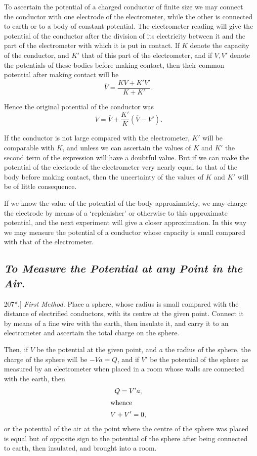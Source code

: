 \documentclass[12pt,oneside]{book}[2021/10/04]
\newcommand{\Heading}{\centering\normalfont}
\newcommand{\Subsection}[1]{\subsection*{\normalsize\Heading\itshape #1}}
\newcommand{\Runhead}[1]{\fancyhead[C]{\iffloatpage{}{\small#1}}}
\newcommand{\article}[1]{\phantomsection \label{art:#1}{#1.]}}
\newcommand{\¬}{\hphantom{0}}
\begin{document}
To ascertain the potential of a charged conductor of finite size
we may connect the conductor with one electrode of the electrometer,
while the other is connected to earth or to a body of
constant potential. The electrometer reading will give the potential
of the conductor after the division of its electricity between it
and the part of the electrometer with which it is put in contact.
If \(K\) denote the capacity of the conductor, and \(K'\) that of this part
of the electrometer, and if \(V, V'\) denote the potentials of these
bodies before making contact, then their common potential after
making contact will be
\[
  \overline{V} = \frac{KV + K'V'}{K + K'}\text{.}
\]

Hence the original potential of the conductor was
\[
  V = \overline{V} + \frac{K'}{K} (\overline{V} - V')\text{.}
\]

If the conductor is not large compared with the electrometer,
\(K'\) will be comparable with \(K\), and unless we can ascertain the
values of \(K\) and \(K'\) the second term of the expression will have
a doubtful value. But if we can make the potential of the electrode
of the electrometer very nearly equal to that of the body before
making contact, then the uncertainty of the values of \(K\) and \(K'\)
will be of little consequence.

If we know the value of the potential of the body approximately,
we may charge the electrode by means of a `replenisher' or otherwise
to this approximate potential, and the next experiment will
give a closer approximation. In this way we may measure the
potential of a conductor whose capacity is small compared with that
of the electrometer.

\Subsection{To Measure the Potential at any Point in the Air.}

\article{207*} \textit{First Method.} Place a sphere, whose radius is small compared
with the distance of electrified conductors, with its centre
at the given point. Connect it by means of a fine wire with the
earth, then insulate it, and carry it to an electrometer and ascertain
the total charge on the sphere.
\Runhead{POTENTIAL AT ANY POINT IN THE AIR.}

Then, if \(V\) be the potential at the given point, and \(a\) the
radius of the sphere, the charge of the sphere will be \(-Va = Q\),
and if \(V'\) be the potential of the sphere as measured by an
electrometer when placed in a room whose walls are connected
with the earth, then
\begin{gather*}
Q = V'a\text{,}\\
\shortintertext{whence}
V + V' = 0\text{,}
\end{gather*}
or the potential of the air at the point where the centre of the
sphere was placed is equal but of opposite sign to the potential of
the sphere after being connected to earth, then insulated, and
brought into a room.
\end{document}
